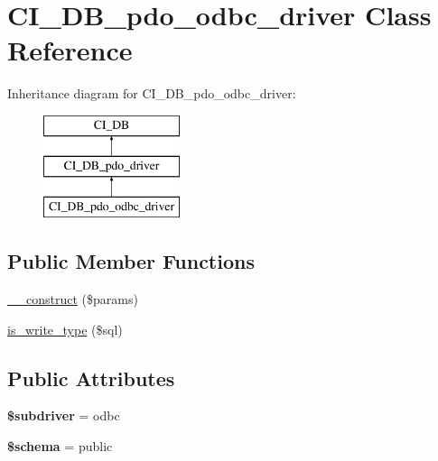 \hypertarget{class_c_i___d_b__pdo__odbc__driver}{}\section{C\+I\+\_\+\+D\+B\+\_\+pdo\+\_\+odbc\+\_\+driver Class Reference}
\label{class_c_i___d_b__pdo__odbc__driver}
Inheritance diagram for C\+I\+\_\+\+D\+B\+\_\+pdo\+\_\+odbc\+\_\+driver\+:\begin{figure}[H]
\begin{center}
\leavevmode
\includegraphics[height=3.000000cm]{class_c_i___d_b__pdo__odbc__driver}
\end{center}
\end{figure}
\subsection*{Public Member Functions}
\begin{DoxyCompactItemize}
\item 
\mbox{\hyperlink{class_c_i___d_b__pdo__odbc__driver_ab9b440e8235b717b5fb073773782e7bc}{\+\_\+\+\_\+construct}} (\$params)
\item 
\mbox{\hyperlink{class_c_i___d_b__pdo__odbc__driver_a3c1ca0b05e314d55bf1d2d001fb6cb4e}{is\+\_\+write\+\_\+type}} (\$sql)
\end{DoxyCompactItemize}
\subsection*{Public Attributes}
\begin{DoxyCompactItemize}
\item 
\mbox{\label{class_c_i___d_b__pdo__odbc__driver_a4a047710f30348e5398b511b109d9eab}} 
{\bfseries \$subdriver} = \textquotesingle{}odbc\textquotesingle{}
\item 
\mbox{\label{class_c_i___d_b__pdo__odbc__driver_a95c9cde0c7883d0f39dc79215c96fff4}} 
{\bfseries \$schema} = \textquotesingle{}public\textquotesingle{}
\end{DoxyCompactItemize}
